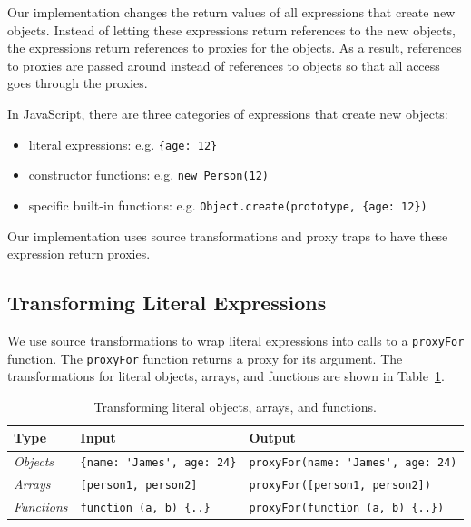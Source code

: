 Our implementation changes the return values of all expressions that create new objects.
Instead of letting these expressions return references to the new objects, the expressions return references to proxies for the objects.
As a result, references to proxies are passed around instead of references to objects so that all access goes through the proxies.

In JavaScript, there are three categories of expressions that create new objects: 
\begin{itemize}
    \item literal expressions: e.g. \lstinline|{age: 12}|
    \item constructor functions: e.g. \lstinline|new Person(12)|
    \item specific built-in functions: e.g. \lstinline|Object.create(prototype, {age: 12})|
\end{itemize}

Our implementation uses source transformations and proxy traps to have these expression return proxies.


\subsection{Transforming Literal Expressions}

We use source transformations to wrap literal expressions into calls to a \lstinline{proxyFor} function.
The \lstinline{proxyFor} function returns a proxy for its argument.
The transformations for literal objects, arrays, and functions are shown in Table~\ref{table:literalTransforms}.

\begin{table}[h]
\begin{center}
\begin{tabular}{| l | l | l |}
\hline
Type & Input & Output \\ \hline
\emph{Objects} & \lstinline|{name: 'James', age: 24}| & \lstinline|proxyFor(name: 'James', age: 24)| \\ \hline
\emph{Arrays} & \lstinline|[person1, person2]| & \lstinline|proxyFor([person1, person2])| \\ \hline
\emph{Functions} & \lstinline|function (a, b) {..}| & \lstinline|proxyFor(function (a, b) {..})| \\ \hline
\end{tabular}
\end{center}
\caption[Table caption text]{Transforming literal objects, arrays, and functions.}
\label{table:literalTransforms}
\end{table}

